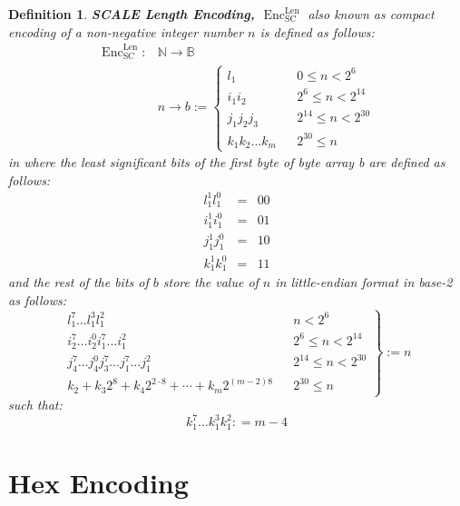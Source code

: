 \documentclass{book}
\newcommand{\assign}{:=}
\newcommand{\cdummy}{\cdot}
\newcommand{\nosymbol}{}
\newcommand{\tmop}[1]{\ensuremath{\operatorname{#1}}}
\newcommand{\tmstrong}[1]{\textbf{#1}}
\newcommand{\tmtextbf}[1]{{\bfseries{#1}}}
\newtheorem{definition}{Definition}
\providecommand{\cdummy}{{\cdot}}
\providecommand{\nosymbol}{}
\providecommand{\tmop}[1]{\ensuremath{\mathrm{#1}}}
\providecommand{\tmstrong}[1]{\tmtextbf{#1}}
\providecommand{\tmtextbf}[1]{\tmtextbf{#1}}
\newtheorem{definition}{Definition}
\begin{document}
\begin{definition}
  \label{defn-sc-len-encoding}{\tmstrong{SCALE Length Encoding,
  $\tmop{Enc}^{\tmop{Len}}_{\tmop{SC}}$}} also known as compact encoding of a
  non-negative integer number $n$ is defined as follows:
  \[ \begin{array}{ll}
       \tmop{Enc}^{\tmop{Len}}_{\tmop{SC}} : & \mathbb{N} \rightarrow
       \mathbb{B}\\
       & n \rightarrow b \assign \left\{ \begin{array}{lll}
         l^{\nosymbol}_1 &  & 0 \leqslant n < 2^6\\
         i^{\nosymbol}_1 i^{\nosymbol}_2 &  & 2^6 \leqslant n < 2^{14}\\
         j^{\nosymbol}_1 j^{\nosymbol}_2 j_3 &  & 2^{14} \leqslant n <
         2^{30}\\
         k_1^{\nosymbol} k_2^{\nosymbol} \ldots k_m^{\nosymbol}  &  & 2^{30}
         \leqslant n
       \end{array} \right.
     \end{array} \]
  in where the least significant bits of the first byte of byte array b are
  defined as follows:
  \[ \begin{array}{lcc}
       l^1_1 l_1^0 & = & 00\\
       i^1_1 i_1^0 & = & 01\\
       j^1_1 j_1^0 & = & 10\\
       k^1_1 k_1^0 & = & 11
     \end{array} \]
  and the rest of the bits of $b$ store the value of $n$ in little-endian
  format in base-2 as follows:
  \[ \left. \begin{array}{lll}
       l^7_1 \ldots l^3_1 l^2_1 &  & n < 2^6\\
       i_2^7 \ldots i_2^0 i_1^7 \ldots i^2_1^{\nosymbol} &  & 2^6 \leqslant n
       < 2^{14}\\
       j_4^7 \ldots j_4^0 j_3^7 \ldots j_1^7 \ldots j^2_1 &  & 2^{14}
       \leqslant n < 2^{30}\\
       k_2 + k_3 2^8 + k_4 2^{2 \cdummy 8} + \cdots + k_m 2^{(m - 2) 8} &  &
       2^{30} \leqslant n
     \end{array} \right\} \assign n \]
  such that:
  \[ k^7_1 \ldots k^3_1 k^2_1 : = m - 4 \]
\end{definition}

\section{Hex Encoding}
\end{document}
